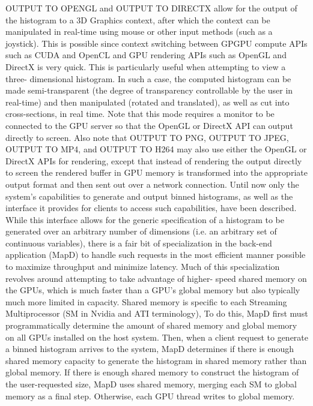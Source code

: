 \documentclass[twocolumn]{article}
\begin{document}
OUTPUT TO OPENGL and OUTPUT TO DIRECTX allow for the output of the histogram to a 3D Graphics context, after which the context can be manipulated in real-time using mouse or other input methods (such as a joystick). This is possible since context switching between GPGPU compute APIs such as CUDA and OpenCL and GPU rendering APIs such as OpenGL and DirectX is very quick. This is particularly useful when attempting to view a three- dimensional histogram. In such a case, the computed histogram can be made semi-transparent
(the degree of transparency controllable by the user in real-time) and then manipulated (rotated and translated), as well as cut into cross-sections, in real time. Note that this mode requires a monitor to be connected to the GPU server so that the OpenGL or DirectX API can output directly to screen. Also note that OUTPUT TO PNG, OUTPUT TO JPEG, OUTPUT TO MP4, and OUTPUT TO H264 may also use either the OpenGL or DirectX APIs for rendering, except that instead of rendering the output directly to screen the rendered buffer in GPU memory is transformed into the appropriate output format and then sent out over a network connection.
Until now only the system’s capabilities to generate and output binned histograms, as well as the interface it provides for clients to access such capabilities, have been described. While this interface allows for the generic specification of a histogram to be generated over an arbitrary number of dimensions (i.e. an arbitrary set of continuous variables), there is a fair bit of specialization in the back-end application (MapD) to handle such requests in the most efficient manner possible to maximize throughput and minimize latency.
Much of this specialization revolves around attempting to take advantage of higher- speed shared memory on the GPUs, which is much faster than a GPU’s global memory but also typically much more limited in capacity. Shared memory is specific to each Streaming Multiprocessor (SM in Nvidia and ATI terminology), To do this, MapD first must programmatically determine the amount of shared memory and global memory on all GPUs installed on the host system. Then, when a client request to generate a binned histogram arrives to the system, MapD determines if there is enough shared memory capacity to generate the histogram in shared memory rather than global memory. If there is enough shared memory to construct the histogram of the user-requested size, MapD uses shared memory, merging each SM to global memory as a final step. Otherwise, each GPU thread writes to global memory.
\end{document}
